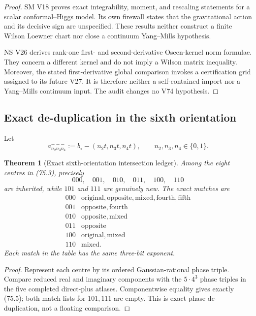 \documentclass[11pt,oneside]{article}
\newtheorem{theorem}{Theorem}[section]
\theoremstyle{definition}
\theoremstyle{remark}
\begin{document}
\begin{proof}
SM V18 proves exact integrability, moment, and rescaling statements
for a scalar conformal--Higgs model.  Its own firewall states that
the gravitational action and its decisive sign are unspecified.
These results neither construct a finite Wilson Loewner chart nor
close a continuum Yang--Mills hypothesis.

NS V26 derives rank-one first- and second-derivative Oseen-kernel
norm formulae.  They concern a different kernel and do not imply a
Wilson matrix inequality.  Moreover, the stated first-derivative
global comparison invokes a certification grid assigned to its
future V27.  It is therefore neither a self-contained import nor a
Yang--Mills continuum input.  The audit changes no V74 hypothesis.
\end{proof}

\subsection{Exact de-duplication in the sixth orientation}

Let
\[
 a^{---}_{n_2n_3n_4}
 :=b_\circ-(n_2t,n_3t,n_4t),
 \qquad n_2,n_3,n_4\in\{0,1\}.                         \tag{75.3}
\]

\begin{theorem}[Exact sixth-orientation intersection ledger]
\label{thm:newv75-intersections}
Among the eight centres in (75.3), precisely
\[
 000,\quad001,\quad010,\quad011,\quad100,\quad110      \tag{75.4}
\]
are inherited, while \(101\) and \(111\) are genuinely new.  The
exact matches are
\[
\begin{array}{c|l}
000&\mathrm{original},\mathrm{opposite},\mathrm{mixed},
     \mathrm{fourth},\mathrm{fifth}\\
001&\mathrm{opposite},\mathrm{fourth}\\
010&\mathrm{opposite},\mathrm{mixed}\\
011&\mathrm{opposite}\\
100&\mathrm{original},\mathrm{mixed}\\
110&\mathrm{mixed}.
\end{array}                                             \tag{75.5}
\]
Each match in the table has the same three-bit exponent.
\end{theorem}

\begin{proof}
Represent each centre by its ordered Gaussian-rational phase triple.
Compare reduced real and imaginary components with the
\(5\cdot4^3\) phase triples in the five completed direct-plus
atlases.  Componentwise equality gives exactly (75.5); both match
lists for \(101,111\) are empty.  This is exact phase
de-duplication, not a floating comparison.
\end{proof}
\end{document}
